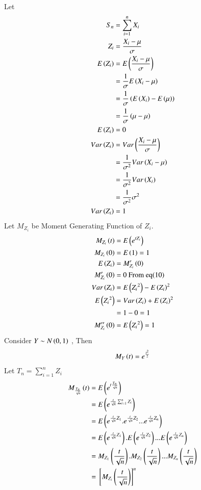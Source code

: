 \documentclass[journal,12pt,twocolumn]{IEEEtran}
\begin{document}
\\Let
\begin{align}
    S_n &= \sum_{i=1}^{n} X_i\\
    Z_i &= \frac{X_i-\mu}{\sigma}\\
    E\left(Z_i\right)&=E\left(\frac{X_i-\mu}{\sigma}\right)\\
    &= \frac{1}{\sigma}E\left(X_i - \mu\right)\nonumber\\
    &= \frac{1}{\sigma}\left(E\left(X_i\right)-E\left(\mu\right)\right)\nonumber\\
    &= \frac{1}{\sigma}\left(\mu -\mu\right)\nonumber\\
    E\left(Z_i\right)&=0\\
    Var\left(Z_i\right)&=Var\left(\frac{X_i-\mu}{\sigma}\right)\\
    &=\frac{1}{\sigma^2}Var\left(X_i-\mu\right)\nonumber\\
    &=\frac{1}{\sigma^2}Var\left(X_i\right)\nonumber\\
    &=\frac{1}{\sigma^2}\sigma^2\nonumber\\
    Var\left(Z_i\right)&=1
    \end{align}
Let $M_{Z_i}$ be Moment Generating Function of $Z_i$.
\begin{align}
      M_{Z_i}\left(t\right)&=E\left(e^{tZ_i}\right)\\
      M_{Z_i}\left(0\right)&=E\left(1\right)=1\\
      E\left(Z_i\right)&=M_{Z_i}'\left(0\right)\\
      M_{Z_i}'\left(0\right)&=0 \text{ From eq(10)}\\
      Var\left(Z_i\right)&=E\left({Z_i}^2\right)-{E\left(Z_i\right)^2}\\
      E\left({Z_i}^2\right)&=Var\left(Z_i\right)+E\left(Z_i\right)^2\nonumber\\
      &=1-0=1\nonumber\\
      M_{Z_i}''\left(0\right)&=E\left({Z_i}^2\right)=1
    \end{align}
Consider $Y \sim N\left(0,1\right)$ , Then
\begin{align}
    M_Y\left(t\right)=e^{\frac{t^2}{2}}
    \end{align}
Let $T_n=\sum_{i=1}^{n} Z_i$
\begin{align}
    M_{\frac{T_n}{\sqrt{n}}}\left(t\right)&=E\left(e^{t\frac{T_n}{\sqrt{n}}}\right)\\
    &=E\left(e^{\frac{t}{\sqrt{n}}\sum_{i=1}^{n} Z_i}\right)\nonumber\\
    &=E\left(e^{\frac{t}{\sqrt{n}}Z_1}.e^{\frac{t}{\sqrt{n}}Z_2}...e^{\frac{t}{\sqrt{n}} Z_n}\right)\nonumber\\
    &=E\left(e^{\frac{t}{\sqrt{n}}Z_1}\right).E\left(e^{\frac{t}{\sqrt{n}}Z_2}\right)...E\left(e^{\frac{t}{\sqrt{n}}Z_n}\right)\nonumber\\
    &=M_{Z_1}\left(\frac{t}{\sqrt{n}}\right).M_{Z_2}\left(\frac{t}{\sqrt{n}}\right)...M_{Z_n}\left(\frac{t}{\sqrt{n}}\right)\nonumber\\
    &={}\left[M_{Z_i}\left(\frac{t}{\sqrt{n}}\right)\right]^n
    \end{align}
\end{document}
